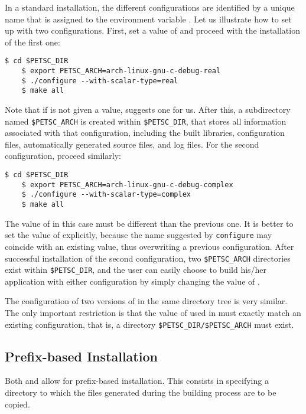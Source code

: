 In a standard installation, the different configurations are identified by a unique name that is assigned to the environment variable . Let us illustrate how to set up \petsc with two configurations. First, set a value of  and proceed with the installation of the first one:
	\begin{Verbatim}[fontsize=\small]
	$ cd $PETSC_DIR
	$ export PETSC_ARCH=arch-linux-gnu-c-debug-real
	$ ./configure --with-scalar-type=real
	$ make all
	\end{Verbatim}
Note that if  is not given a value, \petsc suggests one for us. After this, a subdirectory named \texttt{\$PETSC\_ARCH} is created within \texttt{\$PETSC\_DIR}, that stores all information associated with that configuration, including the built libraries, configuration files, automatically generated source files, and log files. For the second configuration, proceed similarly:
	\begin{Verbatim}[fontsize=\small]
	$ cd $PETSC_DIR
	$ export PETSC_ARCH=arch-linux-gnu-c-debug-complex
	$ ./configure --with-scalar-type=complex
	$ make all
	\end{Verbatim}
The value of  in this case must be different than the previous one. It is better to set the value of  explicitly, because the name suggested by \texttt{configure} may coincide with an existing value, thus overwriting a previous configuration. After successful installation of the second configuration, two \texttt{\$PETSC\_ARCH} directories exist within \texttt{\$PETSC\_DIR}, and the user can easily choose to build his/her application with either configuration by simply changing the value of .

The configuration of two versions of \slepc in the same directory tree is very similar. The only important restriction is that the value of  used in \slepc must exactly match an existing \petsc configuration, that is, a directory \texttt{\$PETSC\_DIR/\$PETSC\_ARCH} must exist.

\subsection{Prefix-based Installation}
\label{sec:prefix-inst}

Both \petsc and \slepc allow for prefix-based installation. This consists in specifying a directory to which the files generated during the building process are to be copied.

